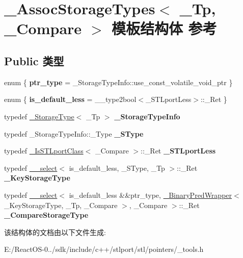 \hypertarget{struct___assoc_storage_types}{}\section{\+\_\+\+Assoc\+Storage\+Types$<$ \+\_\+\+Tp, \+\_\+\+Compare $>$ 模板结构体 参考}
\label{struct___assoc_storage_types}
\subsection*{Public 类型}
\begin{DoxyCompactItemize}
\item 
\mbox{\label{struct___assoc_storage_types_a3ab3a9907f4b55184b497e1c92e36d45}} 
enum \{ {\bfseries ptr\+\_\+type} = \+\_\+\+Storage\+Type\+Info\+:\+:use\+\_\+const\+\_\+volatile\+\_\+void\+\_\+ptr
 \}
\item 
\mbox{\label{struct___assoc_storage_types_ab14266e8afdfa5ef43d4196c2c8ba951}} 
enum \{ {\bfseries is\+\_\+default\+\_\+less} = \+\_\+\+\_\+type2bool$<$\+\_\+\+S\+T\+Lport\+Less$>$\+:\+:\+\_\+\+Ret
 \}
\item 
\mbox{\label{struct___assoc_storage_types_aff7edda2f0daba6aa14054d444d89dd6}} 
typedef \hyperlink{struct___storage_type}{\+\_\+\+Storage\+Type}$<$ \+\_\+\+Tp $>$ {\bfseries \+\_\+\+Storage\+Type\+Info}
\item 
\mbox{\label{struct___assoc_storage_types_ac5c1581d04ddd076314a6ca74187a837}} 
typedef \+\_\+\+Storage\+Type\+Info\+::\+\_\+\+Type {\bfseries \+\_\+\+S\+Type}
\item 
\mbox{\label{struct___assoc_storage_types_a1f133a37df61f7ee4c39d89936769005}} 
typedef \hyperlink{struct___is_s_t_lport_class}{\+\_\+\+Is\+S\+T\+Lport\+Class}$<$ \+\_\+\+Compare $>$\+::\+\_\+\+Ret {\bfseries \+\_\+\+S\+T\+Lport\+Less}
\item 
\mbox{\label{struct___assoc_storage_types_a1e8e796d3769249b1b4c343a08826abe}} 
typedef \hyperlink{struct____select}{\+\_\+\+\_\+select}$<$ is\+\_\+default\+\_\+less, \+\_\+\+S\+Type, \+\_\+\+Tp $>$\+::\+\_\+\+Ret {\bfseries \+\_\+\+Key\+Storage\+Type}
\item 
\mbox{\label{struct___assoc_storage_types_a757a1b40d71c85d0351867e6fae8b3f8}} 
typedef \hyperlink{struct____select}{\+\_\+\+\_\+select}$<$ is\+\_\+default\+\_\+less \&\&ptr\+\_\+type, \hyperlink{struct___binary_pred_wrapper}{\+\_\+\+Binary\+Pred\+Wrapper}$<$ \+\_\+\+Key\+Storage\+Type, \+\_\+\+Tp, \+\_\+\+Compare $>$, \+\_\+\+Compare $>$\+::\+\_\+\+Ret {\bfseries \+\_\+\+Compare\+Storage\+Type}
\end{DoxyCompactItemize}


该结构体的文档由以下文件生成\+:\begin{DoxyCompactItemize}
\item 
E\+:/\+React\+O\+S-\/0../sdk/include/c++/stlport/stl/pointers/\+\_\+tools.\+h\end{DoxyCompactItemize}
